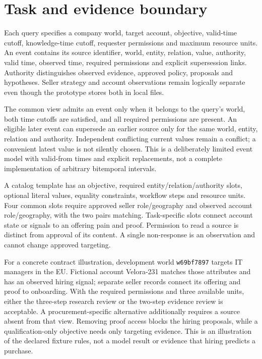 \section{Task and evidence boundary}
\label{sec:task}

Each query specifies a company world, target account, objective, valid-time cutoff, knowledge-time cutoff, requester permissions and maximum resource units. An event contains its source identifier, world, entity, relation, value, authority, valid time, observed time, required permissions and explicit supersession links. Authority distinguishes observed evidence, approved policy, proposals and hypotheses. Seller strategy and account observations remain logically separate even though the prototype stores both in local files.

The common view admits an event only when it belongs to the query's world, both time cutoffs are satisfied, and all required permissions are present. An eligible later event can supersede an earlier source only for the same world, entity, relation and authority. Independent conflicting current values remain a conflict; a convenient latest value is not silently chosen. This is a deliberately limited event model with valid-from times and explicit replacements, not a complete implementation of arbitrary bitemporal intervals.

A catalog template has an objective, required entity/relation/authority slots, optional literal values, equality constraints, workflow steps and resource units. Four common slots require approved seller role/geography and observed account role/geography, with the two pairs matching. Task-specific slots connect account state or signals to an offering pain and proof. Permission to read a source is distinct from approval of its content. A single non-response is an observation and cannot change approved targeting.

For a concrete contract illustration, development world \texttt{w69bf7897} targets IT managers in the EU. Fictional account Velora-231 matches those attributes and has an observed hiring signal; separate seller records connect its offering and proof to onboarding. With the required permissions and three available units, either the three-step research review or the two-step evidence review is acceptable. A procurement-specific alternative additionally requires a source absent from that view. Removing proof access blocks the hiring proposals, while a qualification-only objective needs only targeting evidence. This is an illustration of the declared fixture rules, not a model result or evidence that hiring predicts a purchase.

